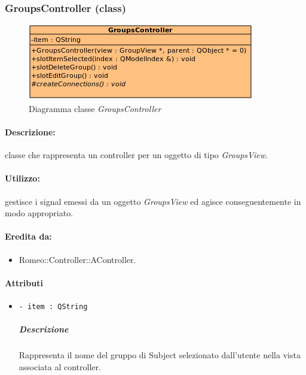 	\subsubsection{GroupsController (class)}
	\begin{figure}[!h]
		\centering
		\includegraphics[width=0.6\linewidth]{./Content/Immagini/controller/GroupsController}
		\caption{Diagramma classe \textsl{GroupsController}}
	\end{figure}
	\paragraph{Descrizione:} classe che rappresenta un controller per un oggetto di tipo \textsl{GroupsView}.
	\paragraph{Utilizzo:} gestisce i signal\g{} emessi da un oggetto \textsl{GroupsView} ed agisce conseguentemente in modo appropriato.
	\paragraph{Eredita da:}
		\begin{itemize}
			\item Romeo::Controller::AController.
		\end{itemize}
	\paragraph{Attributi}
		\begin{itemize}
			\item \color{teal} \verb!- item : QString!
			\color{black}
			\subparagraph{Descrizione} Rappresenta il nome del gruppo di Subject\g{} selezionato dall'utente nella vista associata al controller.
		\end{itemize}
